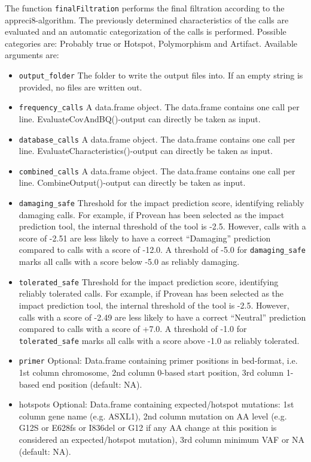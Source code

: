 \documentclass{article}
\begin{document}
The function \texttt{finalFiltration} performs the final filtration according to the appreci8-algorithm. The previously determined characteristics of the calls are evaluated and an automatic categorization of the calls is performed. Possible categories are: Probably true or Hotspot, Polymorphism and Artifact. Available arguments are:

\begin{itemize}
  \item \texttt{output\_folder} The folder to write the output files into. If an empty string is provided, no files are written out.
  \item \texttt{frequency\_calls} A data.frame object. The data.frame contains one call per line. EvaluateCovAndBQ()-output can directly be taken as input.
  \item \texttt{database\_calls} A data.frame object. The data.frame contains one call per line. EvaluateCharacteristics()-output can directly be taken as input.
  \item \texttt{combined\_calls} A data.frame object. The data.frame contains one call per line. CombineOutput()-output can directly be taken as input.
  \item \texttt{damaging\_safe} Threshold for the impact prediction score, identifying reliably damaging calls. For example, if Provean has been selected as the impact prediction tool, the internal threshold of the tool is -2.5. However, calls with a score of -2.51 are less likely to have a correct ``Damaging'' prediction compared to calls with a score of -12.0. A threshold of -5.0 for \texttt{damaging\_safe} marks all calls with a score below -5.0 as reliably damaging.
  \item \texttt{tolerated\_safe} Threshold for the impact prediction score, identifying reliably tolerated calls. For example, if Provean has been selected as the impact prediction tool, the internal threshold of the tool is -2.5. However, calls with a score of -2.49 are less likely to have a correct ``Neutral'' prediction compared to calls with a score of +7.0. A threshold of -1.0 for \texttt{tolerated\_safe} marks all calls with a score above -1.0 as reliably tolerated.
  \item \texttt{primer} Optional: Data.frame containing primer positions in bed-format, i.e. 1st column chromosome, 2nd column 0-based start position, 3rd column 1-based end position (default: NA).
  \item{hotspots} Optional: Data.frame containing expected/hotspot mutations: 1st column gene name (e.g. ASXL1), 2nd column mutation on AA level (e.g. G12S or E628fs or I836del or G12 if any AA change at this position is considered an expected/hotspot mutation), 3rd column minimum VAF or NA (default: NA).

\end{itemize}
\end{document}
